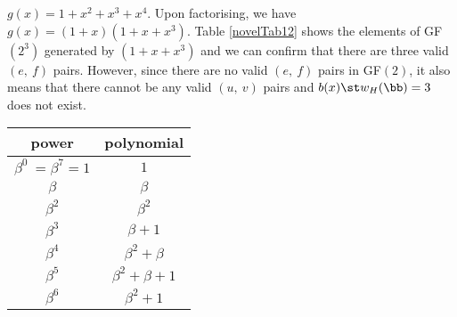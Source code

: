   \begin{example}
 $g(x)=1+x^2+x^3+x^4$.\newline
  Upon factorising, we have $g(x)=(1+x)(1+x+x^3)$. Table \ref{novelTab12} shows the elements of GF$(2^3)$ generated by $(1+x+x^3)$ and we can confirm that there are three valid $(e,~f)$ pairs. However, since there are no valid $(e,~f)$ pairs in GF$(2)$, it also means that there cannot be any valid $(u,~v)$ pairs and $b(x) \st w_H(\bb)=3$ does not exist.
 
 \begin{table*}[h]
 \caption{Non-zero Elements of GF$(2^3)$ generated by $1+x+x^3$}
\centering
 \begin{tabular}{c c} 
 \hline
 power & polynomial \\ [0.5ex] 
 \hline\hline
$\beta^0~=\beta^{7}=1$ & $1$\\
\hline
$\beta$ & $\beta$\\
\hline
$\beta^2$ &  $\beta^2$\\
\hline
$\beta^3$ & $\beta+1$\\
\hline
$\beta^4$ &  $\beta^2+\beta$\\
\hline
$\beta^5$ & $\beta^2+\beta+1$\\
\hline
$\beta^6$ &  $\beta^2+1$\\
 \end{tabular}
 \label{novelTab12}
\end{table*}
 \end{example}




